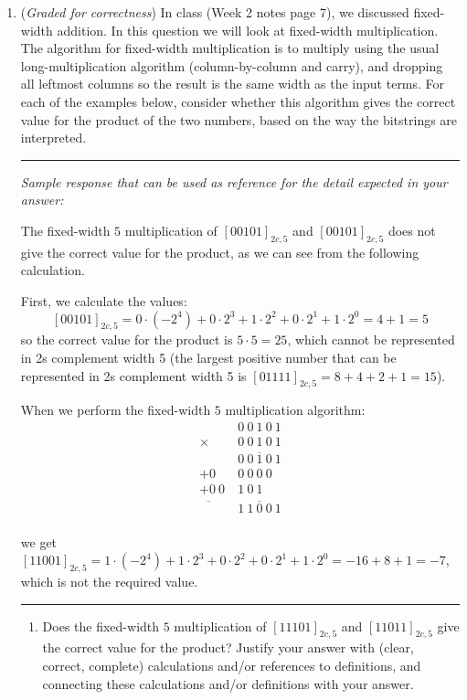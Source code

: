 \begin{enumerate}
    \item ({\it Graded for correctness}) In class (Week 2 notes page 7), we discussed fixed-width addition. In this
    question we will look at fixed-width multiplication. The algorithm for fixed-width 
    multiplication is to multiply using the usual long-multiplication algorithm 
    (column-by-column and carry), and dropping all leftmost columns so the result is the same 
    width as the input terms. For each of the examples below, consider whether 
    this algorithm gives the correct value for the product of the two numbers, based on
    the way the bitstrings are interpreted.

    \rule{0.5\textwidth}{.4pt}

    {\it Sample response that can be used as reference for the detail expected 
    in your answer:} 
    
    The fixed-width $5$ multiplication of $[00101]_{2c,5}$ and $[00101]_{2c,5}$ 
    does not give the correct
    value for the product, as we can see from the following calculation.
    
    First, we calculate the values: 
    \[
        [00101]_{2c,5} = 0\cdot (-2^4) + 0\cdot 2^3 + 1 \cdot 2^2 + 0\cdot 2^1 + 1 \cdot 2^0 = 4 + 1 = 5
    \]
    so the correct value for the product is $5 \cdot 5 = 25$, which cannot be represented
    in 2s complement width 5 (the largest positive number that can be represented in 
    2s complement width 5 is $[01111]_{2c,5} = 8 + 4 + 2 + 1 = 15$).
    
    When we perform the fixed-width $5$ multiplication algorithm:
    \begin{align*}
            & 0~ 0~ 1~ 0~ 1\\
     \times & 0~ 0~ 1~ 0~ 1\\
     &\overline{0~ 0~ 1~ 0~ 1}\\
     + {0~} & {0~0~0~0~~}\\
     + {0~0~} & {1~0~1~~}\\
     \overline{\phantom{0~0~}}&\overline{1~ 1~ 0~ 0~ 1}\\
    \end{align*}

    we get $[11001]_{2c,5} = 1\cdot (-2^4) + 1 \cdot 2^3 + 0 \cdot 2^2 + 0 \cdot 2^1 + 1 \cdot 2^0 = -16 + 8 + 1 = -7$, 
    which is not the required value.

    \rule{0.5\textwidth}{.4pt}


    \begin{enumerate}
        \item Does the fixed-width $5$ multiplication of $[11101]_{2c,5}$ and 
        $[11011]_{2c,5}$ give the correct value for the product?
        Justify your answer  
        with (clear, correct, complete) calculations and/or references to definitions, 
        and connecting these
        calculations and/or definitions with
        your answer.
        

\end{enumerate}
\end{enumerate}
